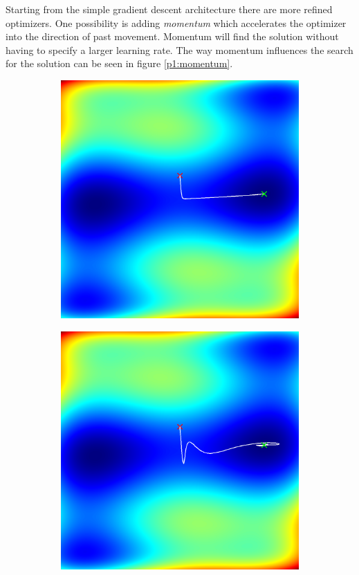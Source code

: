 \documentclass[sigconf,nonacm]{acmart}
\begin{document}
Starting from the simple gradient descent architecture there
are more refined optimizers.
One possibility is adding \emph{momentum} which accelerates
the optimizer into the direction of past movement.
Momentum will find the solution without having to specify
a larger learning rate.
The way momentum influences the search for the solution can
be seen in figure \ref{p1:momentum}.

\begin{figure}[ht]
\begin{subfigure}[c]{0.45\columnwidth}
\includegraphics[width=\textwidth]{sgd-camel-nomomentum.png}
\end{subfigure}
\hspace{2pt}
\begin{subfigure}[c]{0.45\columnwidth}
\includegraphics[width=\textwidth]{sgd-camel-momentum.png}

\end{subfigure}
\end{figure}
\end{document}
